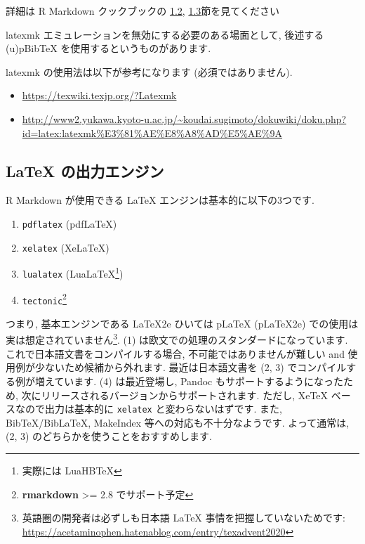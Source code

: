 \documentclass[
]{bxjsarticle}
\providecommand{\tightlist}{%
  \setlength{\itemsep}{0pt}\setlength{\parskip}{0pt}}
\begin{document}
詳細は R Markdown クックブックの \href{https://gedevan-aleksizde.github.io/rmarkdown-cookbook/install-latex.html}{1.2}, \href{https://gedevan-aleksizde.github.io/rmarkdown-cookbook/install-latex-pkgs.html}{1.3}節を見てください

latexmk エミュレーションを無効にする必要のある場面として, 後述する (u)pBibTeX を使用するというものがあります.

latexmk の使用法は以下が参考になります (必須ではありません).

\begin{itemize}
\tightlist
\item
  \url{https://texwiki.texjp.org/?Latexmk}
\item
  \url{http://www2.yukawa.kyoto-u.ac.jp/~koudai.sugimoto/dokuwiki/doku.php?id=latex:latexmk\%E3\%81\%AE\%E8\%A8\%AD\%E5\%AE\%9A}
\end{itemize}

\hypertarget{latex-ux306eux51faux529bux30a8ux30f3ux30b8ux30f3}{%
\subsection{LaTeX の出力エンジン}\label{latex-ux306eux51faux529bux30a8ux30f3ux30b8ux30f3}}

R Markdown が使用できる LaTeX エンジンは基本的に以下の3つです.

\begin{enumerate}
\def\labelenumi{\arabic{enumi}.}
\tightlist
\item
  \texttt{pdflatex} (pdfLaTeX)
\item
  \texttt{xelatex} (XeLaTeX)
\item
  \texttt{lualatex} (LuaLaTeX\footnote{実際には LuaHBTeX})
\item
  \texttt{tectonic}\footnote{\textbf{rmarkdown} \textgreater= 2.8 でサポート予定}
\end{enumerate}

つまり, 基本エンジンである LaTeX2e ひいては pLaTeX (pLaTeX2e) での使用は実は想定されていません\footnote{英語圏の開発者は必ずしも日本語 LaTeX 事情を把握していないためです: \url{https://acetaminophen.hatenablog.com/entry/texadvent2020}}. (1) は欧文での処理のスタンダードになっています. これで日本語文書をコンパイルする場合, 不可能ではありませんが難しい and 使用例が少ないため候補から外れます. 最近は日本語文書を (2, 3) でコンパイルする例が増えています. (4) は最近登場し, Pandoc もサポートするようになったため, 次にリリースされるバージョンからサポートされます. ただし, XeTeX ベースなので出力は基本的に \texttt{xelatex} と変わらないはずです. また, BibTeX/BibLaTeX, MakeIndex 等への対応も不十分なようです. よって通常は, (2, 3) のどちらかを使うことをおすすめします.
\end{document}
